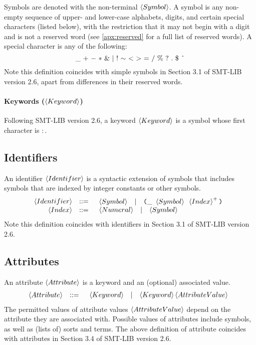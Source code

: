 \documentclass[english,a4paper,10pt]{article}
\newcommand{\mathcircumflex}[0]{\mbox{\^{}}}
\begin{document}
Symbols are denoted with the non-terminal $\left\langle Symbol\right\rangle$. 
A symbol
is any non-empty sequence of upper- and lower-case alphabets, digits,
and certain special characters (listed below), with the restriction that it may not
begin with a digit and is not a reserved word (see \cref{apx:reserved} 
for a full list of reserved words).
A special character is any of the following:
\[
{\tt \_}\mbox{ }{\tt +}\mbox{ }{\tt -}\mbox{ }{\tt *}\mbox{ }{\tt \&}\mbox{ }{\tt |}\mbox{ }{\tt !}\mbox{ }{\tt \sim}\mbox{ }{\tt <}\mbox{ }{\tt >}\mbox{ }{\tt =}\mbox{ }{\tt /}\mbox{ }{\tt \%}\mbox{ }{\tt ?}\mbox{ }{\tt .}\mbox{ }{\tt \$}\mbox{ }{\tt \mathcircumflex}
\]
Note this definition coincides with simple
symbols in Section 3.1 of SMT-LIB version 2.6,
apart from differences in their reserved words.

\paragraph{Keywords ($\left\langle Keyword\right\rangle$)}
Following SMT-LIB version 2.6,
a keyword $\left\langle Keyword\right\rangle$ is a symbol whose first character is $:$.

\subsection{Identifiers}

An identifier $\left\langle Identifier\right\rangle$
is a syntactic extension of symbols 
that includes symbols that are indexed by integer constants or other symbols.
\[
\begin{array}{rcl}
\left\langle Identifier\right\rangle & ::= & \begin{array}{ccc}
\left\langle Symbol\right\rangle & | & \texttt{(}{\tt \_}\mbox{ }\left\langle Symbol\right\rangle\mbox{ }\left\langle Index\right\rangle^{+}\texttt{)}
\end{array}\\
\left\langle Index\right\rangle & ::= & \begin{array}{ccc}
\left\langle Numeral\right\rangle & | & \left\langle Symbol\right\rangle
\end{array}\\
\end{array}
\]
Note this definition coincides with
identifiers in Section 3.1 of SMT-LIB version 2.6.

\subsection{Attributes}

An attribute $\left\langle Attribute\right\rangle$
is a keyword and an (optional) associated value.
\[
\begin{array}{rcl}
\left\langle Attribute\right\rangle & ::= & \begin{array}{ccc}
\left\langle Keyword\right\rangle & | & \left\langle Keyword\right\rangle \left\langle AttributeValue\right\rangle
\end{array}\\
\end{array}
\]
The permitted values of attribute values $\left\langle AttributeValue\right\rangle$ depend on the attribute
they are associated with.
Possible values of attributes include symbols, as well as (lists of) sorts and terms.
The above definition of attribute coincides with
attributes in Section 3.4 of SMT-LIB version 2.6.
\end{document}
